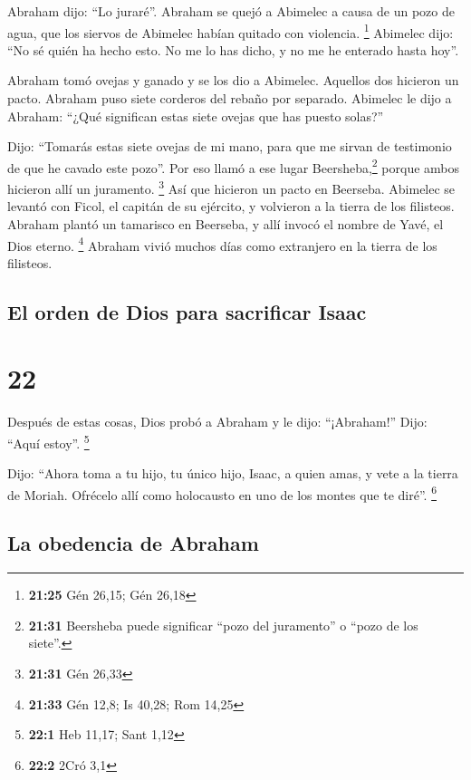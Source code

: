  Abraham dijo: ``Lo juraré''.  Abraham se
quejó a Abimelec a causa de un pozo de agua, que los siervos de Abimelec
habían quitado con violencia. \footnote{\textbf{21:25} Gén 26,15; Gén
  26,18}  Abimelec dijo: ``No sé quién ha hecho esto. No
me lo has dicho, y no me he enterado hasta hoy''.

 Abraham tomó ovejas y ganado y se los dio a Abimelec.
Aquellos dos hicieron un pacto.  Abraham puso siete
corderos del rebaño por separado.  Abimelec le dijo a
Abraham: ``¿Qué significan estas siete ovejas que has puesto solas?''

 Dijo: ``Tomarás estas siete ovejas de mi mano, para que
me sirvan de testimonio de que he cavado este pozo''. 
Por eso llamó a ese lugar Beersheba,\footnote{\textbf{21:31} Beersheba
  puede significar ``pozo del juramento'' o ``pozo de los siete''.}
porque ambos hicieron allí un juramento. \footnote{\textbf{21:31} Gén
  26,33}  Así que hicieron un pacto en Beerseba. Abimelec
se levantó con Ficol, el capitán de su ejército, y volvieron a la tierra
de los filisteos.  Abraham plantó un tamarisco en
Beerseba, y allí invocó el nombre de Yavé, el Dios eterno. \footnote{\textbf{21:33}
  Gén 12,8; Is 40,28; Rom 14,25}  Abraham vivió muchos
días como extranjero en la tierra de los filisteos.

\hypertarget{el-orden-de-dios-para-sacrificar-isaac}{%
\subsection{El orden de Dios para sacrificar
Isaac}\label{el-orden-de-dios-para-sacrificar-isaac}}

\hypertarget{section-21}{%
\section{22}\label{section-21}}

 Después de estas cosas, Dios probó a Abraham y le dijo:
``¡Abraham!'' Dijo: ``Aquí estoy''. \footnote{\textbf{22:1} Heb 11,17;
  Sant 1,12}

 Dijo: ``Ahora toma a tu hijo, tu único hijo, Isaac, a
quien amas, y vete a la tierra de Moriah. Ofrécelo allí como holocausto
en uno de los montes que te diré''. \footnote{\textbf{22:2} 2Cró 3,1}

\hypertarget{la-obedencia-de-abraham}{%
\subsection{La obedencia de Abraham}\label{la-obedencia-de-abraham}}

